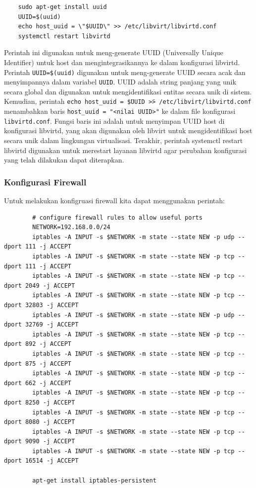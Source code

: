\begin{listing}[H]
    \begin{verbatim}
    sudo apt-get install uuid
    UUID=$(uuid)
    echo host_uuid = \"$UUID\" >> /etc/libvirt/libvirtd.conf
    systemctl restart libvirtd
    \end{verbatim}
\end{listing}

Perintah ini digunakan untuk meng-generate UUID (Universally Unique Identifier) untuk host dan mengintegrasikannya ke dalam konfigurasi libvirtd. Perintah \texttt{UUID=\$(uuid)} digunakan untuk meng-generate UUID secara acak dan menyimpannya dalam variabel \texttt{UUID}. UUID adalah string panjang yang unik secara global dan digunakan untuk mengidentifikasi entitas secara unik di sistem. Kemudian, perintah \texttt{echo host\_uuid = \" \$UUID \"  >> /etc/libvirt/libvirtd.conf} menambahkan baris \texttt{host\_uuid = "<nilai UUID>"} ke dalam file konfigurasi \texttt{libvirtd.conf}. Fungsi baris ini adalah untuk menyimpan UUID host di konfigurasi libvirtd, yang akan digunakan oleh libvirt untuk mengidentifikasi host secara unik dalam lingkungan virtualisasi. Terakhir, perintah systemctl restart libvirtd digunakan untuk merestart layanan libvirtd agar perubahan konfigurasi yang telah dilakukan dapat diterapkan.

\subsubsection{Konfigurasi Firewall}
Untuk melakukan konfigruasi firewall kita dapat menggunakan perintah:

\begin{listing}[H]
    \begin{verbatim}
        # configure firewall rules to allow useful ports
        NETWORK=192.168.0.0/24
        iptables -A INPUT -s $NETWORK -m state --state NEW -p udp --dport 111 -j ACCEPT
        iptables -A INPUT -s $NETWORK -m state --state NEW -p tcp --dport 111 -j ACCEPT
        iptables -A INPUT -s $NETWORK -m state --state NEW -p tcp --dport 2049 -j ACCEPT
        iptables -A INPUT -s $NETWORK -m state --state NEW -p tcp --dport 32803 -j ACCEPT
        iptables -A INPUT -s $NETWORK -m state --state NEW -p udp --dport 32769 -j ACCEPT
        iptables -A INPUT -s $NETWORK -m state --state NEW -p tcp --dport 892 -j ACCEPT
        iptables -A INPUT -s $NETWORK -m state --state NEW -p tcp --dport 875 -j ACCEPT
        iptables -A INPUT -s $NETWORK -m state --state NEW -p tcp --dport 662 -j ACCEPT
        iptables -A INPUT -s $NETWORK -m state --state NEW -p tcp --dport 8250 -j ACCEPT
        iptables -A INPUT -s $NETWORK -m state --state NEW -p tcp --dport 8080 -j ACCEPT
        iptables -A INPUT -s $NETWORK -m state --state NEW -p tcp --dport 9090 -j ACCEPT
        iptables -A INPUT -s $NETWORK -m state --state NEW -p tcp --dport 16514 -j ACCEPT
        
        apt-get install iptables-persistent
    \end{verbatim}
\end{listing}

